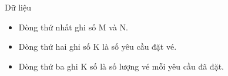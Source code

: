Dữ liệu  
\begin{itemize}
	\item     Dòng thứ nhất ghi số M và N.   
	\item     Dòng thứ hai ghi số K là số yêu cầu đặt vé.   
	\item     Dòng thứ ba ghi K số là số lượng vé mỗi yêu cầu đã đặt.   
\end{itemize}